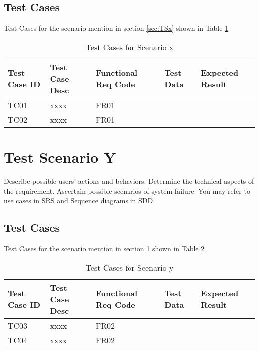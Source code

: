 \documentclass[12pt]{article}
\begin{document}
\subsection{Test Cases}
Test Cases for the scenario mention in section \ref{sec:TSx} shown in Table \ref{tab:TC1}
\begin{table}[h]
\caption{Test Cases for Scenario x}
\label{tab:TC1}
\begin{tabular}{|l|l|l|l|l|}
\hline
Test Case ID & Test Case Desc & Functional Req Code & Test Data & Expected Result \\ \hline
TC01         & xxxx           & FR01                &           &                 \\ \hline
TC02         & xxxx           & FR01                &           &                 \\ \hline
\end{tabular}
\end{table}

\section{Test Scenario Y}\label{sec:TSy}
Describe possible users' actions and behaviors. Determine the technical aspects of the requirement. Ascertain possible scenarios of system failure. You may refer to use cases in SRS and Sequence diagrams in SDD.

\subsection{Test Cases}
Test Cases for the scenario mention in section \ref{sec:TSy} shown in Table \ref{tab:TC2}
\begin{table}[h]
\caption{Test Cases for Scenario y}
\label{tab:TC2}
\begin{tabular}{|l|l|l|l|l|}
\hline
Test Case ID & Test Case Desc & Functional Req Code & Test Data & Expected Result \\ \hline
TC03         & xxxx           & FR02                &           &                 \\ \hline
TC04         & xxxx           & FR02                &           &                 \\ \hline
\end{tabular}
\end{table}
\end{document}
